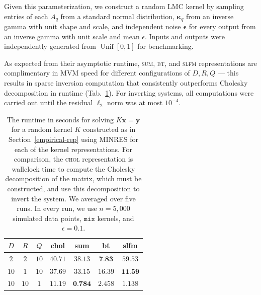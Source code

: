 \documentclass{article}
\def\bse{{\boldsymbol\epsilon}}
\def\bsk{{\boldsymbol\kappa}}
\def\Tx{\textbf{x}}
\def\Ty{\textbf{y}}
\DeclareMathOperator\Unif{Unif}
\begin{document}
Given this parameterization, we construct a random LMC kernel by sampling entries of each $A_q$ from a standard normal distribution, $\bsk_q$ from an inverse gamma with unit shape and scale, and independent noise $\bse$ for every output from an inverse gamma with unit scale and mean $\epsilon$. Inputs and outputs were independently generated from $\Unif[0,1]$ for benchmarking.

As expected from their asymptotic runtime, \textsc{sum}, \textsc{bt}, and \textsc{slfm} representations are complimentary in MVM speed for different configurations of $D,R,Q$ --- this results in sparse inversion computation that consistently outperforms Cholesky decomposition in runtime (Tab.~\ref{complement}).
For inverting systems, all computations were carried out until the residual $\ell_2$ norm was at most $10^{-4}$.



\begin{table}[!ht]
  \caption{The runtime in seconds for solving $K\Tx=\Ty$ for a random kernel $K$ constructed as in Section~\ref{empirical-rep} using MINRES for each of the kernel representations. For comparison, the \textsc{chol} representation is wallclock time to compute the Cholesky decomposition of the matrix, which must be constructed, and use this decomposition to invert the system. We averaged over five runs. In every run, we use $n=5,000$ simulated data points, $\texttt{mix}$ kernels, and $\epsilon=0.1$.
}
\label{complement}
\vskip 0.15in
\begin{center}
\begin{small}
  \begin{sc}
\begin{tabular}{|ccc|cccc|}
  \hline
  \abovespace\belowspace
  $D$ & $R$ & $Q$ & {chol} & {sum} & {bt} & {slfm}\\
\hline
  \abovespace
 $ 2 $ & $ 2 $ & $ 10 $ & $ 40.71 $ & $ 38.13 $ & $ \textbf{7.83} $ & $ 59.53 $ \\ 
 $ 10 $ & $ 1 $ & $ 10 $ & $ 37.69 $ & $ 33.15 $ & $ 16.39 $ & $ \textbf{11.59} $ \\ 
 $ 10 $ & $ 10 $ & $ 1 $ & $ 11.19 $ & $ \textbf{0.784} $ & $ 2.458 $ & $ 1.138 $

  \belowspace \\

  \hline
\end{tabular}
\end{sc}
\end{small}
\end{center}
\vskip -0.1in
\end{table}
\end{document}
